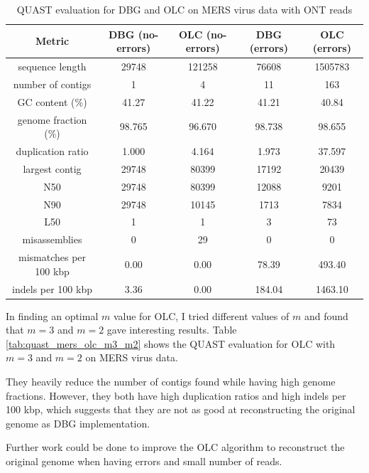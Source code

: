 \documentclass[12pt]{article}
\begin{document}
\begin{table}[h!]
\begin{center}
\begin{tabular}{ |c|c|c||c|c| }
    \hline
    Metric               & DBG (no-errors) & OLC (no-errors) & DBG (errors) & OLC (errors) \\
    \hline
    sequence length      & 29748  & 121258  & 76608 & 1505783 \\
    number of contigs    & 1      & 4       & 11 & 163 \\
    GC content (\%)      & 41.27  & 41.22    & 41.21 & 40.84 \\
    genome fraction (\%) & 98.765 & 96.670    & 98.738 & 98.655 \\
    duplication ratio    & 1.000  & 4.164    & 1.973 & 37.597 \\
    largest contig       & 29748  & 80399    & 17192 & 20439 \\
    N50                  & 29748  & 80399    & 12088 & 9201 \\
    N90                  & 29748  & 10145    & 1713 & 7834 \\
    L50                  & 1      & 1       & 3 & 73 \\
    misassemblies        & 0      & 29        & 0 & 0 \\
    mismatches per 100 kbp & 0.00 & 0.00     & 78.39 & 493.40 \\
    indels per 100 kbp   & 3.36   & 0.00     & 184.04 & 1463.10  \\
    \hline
\end{tabular}
\end{center}
\caption{QUAST evaluation for DBG and OLC on MERS virus data with ONT reads}
\label{tab:quast_mers}
\end{table}

In finding an optimal $m$ value for OLC, I tried different values of $m$ and found that $m = 3$ and $m = 2$ gave interesting results. Table \ref{tab:quast_mers_olc_m3_m2} shows the QUAST evaluation for OLC with $m = 3$ and $m = 2$ on MERS virus data.

They heavily reduce the number of contigs found while having high genome fractions. However, they both have high duplication ratios and high indels per 100 kbp, which suggests that they are not as good at reconstructing the original genome as DBG implementation.

Further work could be done to improve the OLC algorithm to reconstruct the original genome when having errors and small number of reads.
\end{document}
